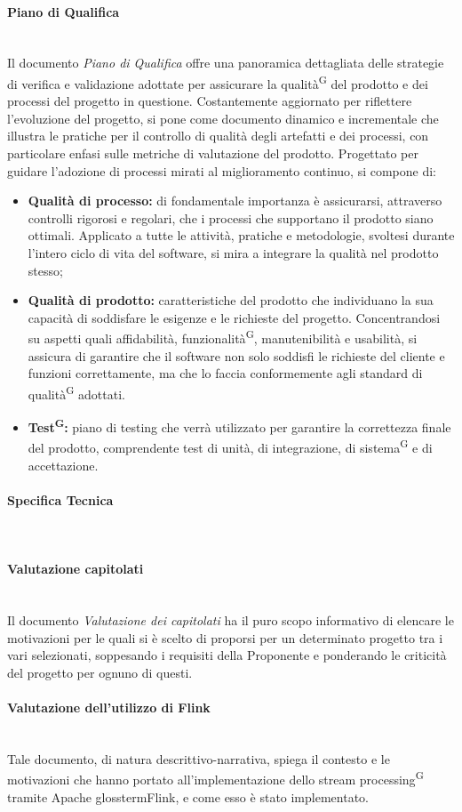 \documentclass[8pt]{article}
\newcommand{\glossterm}[1]{#1\textsuperscript{G}} %
\newcommand{\subsubsubsection}[1]{\paragraph{#1}\mbox{}\\}
\begin{document}
\subsubsubsection{Piano di Qualifica}
Il documento \textit{Piano di Qualifica} offre una panoramica dettagliata delle strategie di verifica e validazione adottate per assicurare la \glossterm{qualità} del prodotto e dei processi del progetto in questione. Costantemente aggiornato per riflettere l'evoluzione del progetto, si pone come documento dinamico e incrementale che illustra le pratiche per il controllo di qualità degli artefatti e dei processi, con particolare enfasi sulle metriche di valutazione del prodotto. Progettato per guidare l'adozione di processi mirati al miglioramento continuo, si compone di:
\begin{itemize}
    \item \textbf{Qualità di processo:} di fondamentale importanza è assicurarsi, attraverso controlli rigorosi e regolari, che i processi che supportano il prodotto siano ottimali. Applicato a tutte le attività, pratiche e metodologie, svoltesi durante l'intero ciclo di vita del software, si mira a integrare la qualità nel prodotto stesso;
    \item \textbf{Qualità di prodotto:} caratteristiche del prodotto che individuano la sua capacità di soddisfare le esigenze e le richieste del progetto. Concentrandosi su aspetti quali affidabilità, \glossterm{funzionalità}, manutenibilità e usabilità, si assicura di garantire che il software non solo soddisfi le richieste del cliente e funzioni correttamente, ma che lo faccia conformemente agli standard di \glossterm{qualità} adottati.
    \item \textbf{\glossterm{Test}:} piano di testing che verrà utilizzato per garantire la correttezza finale del prodotto, comprendente test di unità, di integrazione, di \glossterm{sistema} e di accettazione.
\end{itemize} 

\subsubsubsection{Specifica Tecnica} \label{sec:specifica_tecnica}
%
%
%

\subsubsubsection{Valutazione capitolati}
Il documento \textit{Valutazione dei capitolati} ha il puro scopo informativo di elencare le
motivazioni per le quali si è scelto di proporsi per un determinato progetto tra i vari selezionati,
soppesando i requisiti della Proponente e ponderando le criticità del progetto per ognuno di questi.  

\subsubsubsection{Valutazione dell'utilizzo di Flink}
Tale documento, di natura descrittivo-narrativa, spiega il contesto e le motivazioni che hanno portato all'implementazione dello \glossterm{stream processing} tramite Apache glossterm{Flink}, e come esso è stato implementato.
\end{document}
